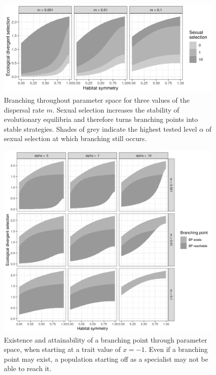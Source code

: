 \begin{figure}
    \centering
    \includegraphics[width=\textwidth]{figures/branching_points}
    \caption{Branching throughout parameter space for three values of the dispersal rate $m$. Sexual selection increases the stability of evolutionary equilibria and therefore turns branching points into stable strategies. Shades of grey indicate the highest tested level $\alpha$ of sexual selection at which branching still occurs.}
    \label{fig:adaptive_dynamics}
\end{figure}


\begin{figure}
    \centering
    \includegraphics[width=\textwidth]{figures/branching_points_combined.png}
    \caption{Existence and attainability of a branching point through parameter space, when starting at a trait value of $x = -1$. Even if a branching point may exist, a population starting off as a specialist may not be able to reach it.}
    \label{fig:adaptive_dynamics2}
\end{figure}